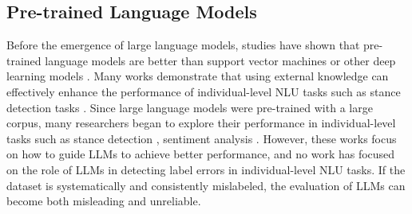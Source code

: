 \subsection{Pre-trained Language Models}
Before the emergence of large language models, studies have shown that pre-trained language models are better than support vector machines or other deep learning models \cite{ghosh2019stance}. Many works demonstrate that using external knowledge can effectively enhance the performance of individual-level NLU tasks such as stance detection tasks \cite{he2022infusing, hanawa2019stance, li2021improving}. Since large language models were pre-trained with a large corpus, many researchers began to explore their performance in individual-level tasks such as stance detection \cite{zhang2022would, cruickshank2023use, lan2024stance, li2024advancing, gatto2023chain}, sentiment analysis \cite{zhang2023sentiment, korkmaz2023analyzing}.  However, these works focus on how to guide LLMs to achieve better performance, and no work has focused on the role of LLMs in detecting label errors in individual-level NLU tasks. If the dataset is systematically and consistently mislabeled, the evaluation of LLMs can become both misleading and unreliable.